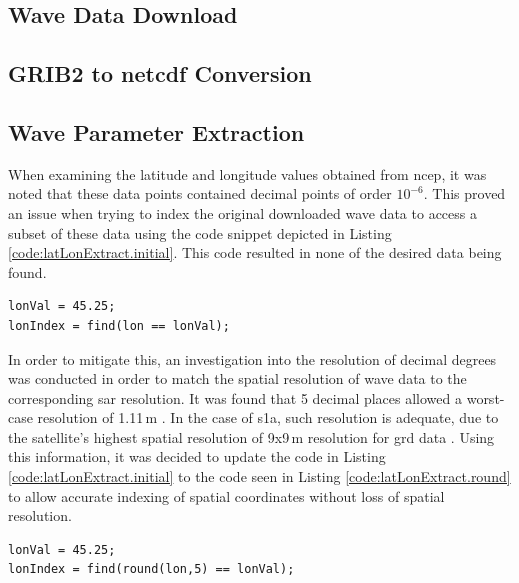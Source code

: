 \subsection{Wave Data Download} \label{subsec:systemDesign.waveSpectrum.download}

\subsection{GRIB2 to \acs{netcdf} Conversion} \label{subsec:systemDesign.waveSpectrum.toNetCDF}

\subsection{Wave Parameter Extraction} \label{subsec:systemDesign.waveSpectrum.parameters}


When examining the latitude and longitude values obtained from \acs{ncep}, it was noted that these data points contained decimal points of order $10^{-6}$. This proved an issue when trying to index the original downloaded wave data to access a subset of these data using the code snippet depicted in Listing \ref{code:latLonExtract.initial}. This code resulted in none of the desired data being found.

\begin{lstlisting}[caption={Initial implementation of \textsc{Matlab} code to extract wave parameters at certain geographical location.},label={code:latLonExtract.initial}]
lonVal = 45.25;
lonIndex = find(lon == lonVal);
\end{lstlisting}

In order to mitigate this, an investigation into the resolution of decimal degrees was conducted in order to match the spatial resolution of wave data to the corresponding \acs{sar} resolution. It was found that 5 decimal places allowed a worst-case resolution of 1.11\,m \cite{decimalDegreesWikipedia}. In the case of \acs{s1a}, such resolution is adequate, due to the satellite's highest spatial resolution of 9x9\,m resolution for \acs{grd} data \cite{sentinel1ProductDef}. Using this information, it was decided to update the code in Listing \ref{code:latLonExtract.initial} to the code seen in Listing \ref{code:latLonExtract.round} to allow accurate indexing of spatial coordinates without loss of spatial resolution.

\begin{lstlisting}[caption={Updated implementation of \textsc{Matlab} code to extract wave parameters at certain geographical location.},label={code:latLonExtract.round}]
lonVal = 45.25;
lonIndex = find(round(lon,5) == lonVal);
\end{lstlisting}


